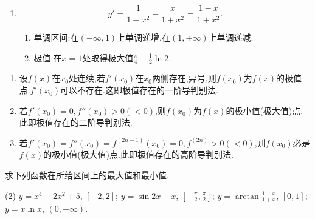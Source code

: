 \begin{solution}
\begin{enumerate}
\begin{enumerate}
              \end{enumerate}
        \item $$y' = \frac{1}{1+x^2} - \frac{x}{1+x^2} = \frac{1 - x}{1 + x^2}.$$
              \begin{enumerate}
                  \item[] 单调区间:在$(-\infty,1)$上单调递增,在$(1,+\infty)$上单调递减.
                  \item[] 极值:在$x = 1$处取得极大值$\frac{\pi}{4} - \frac{1}{2}\ln 2$.
              \end{enumerate}
    \end{enumerate}
\end{solution}

\begin{proposition*}[极值点的判别法] \quad
    \begin{enumerate}
        \item 设$f(x)$在$x_0$处连续,若$f'(x_0)$在$x_0$两侧存在,异号,则$f(x_0)$为$f(x)$的极值点.$f'(x_0)$可以不存在.这即极值存在的一阶导判别法.
        \item 若$f'(x_0) = 0, f''(x_0) > 0(<0)$,则$f(x_0)$为$f(x)$的极小值(极大值)点.此即极值存在的二阶导判别法.
        \item 若$f'(x_0) = f''(x_0) = f^{(2n-1)}(x_0) = 0, f^{(2n)} >0 (<0)$,则$f(x_0)$必是$f(x)$的极小值(极大值)点.此即极值存在的高阶导判别法.
    \end{enumerate}
\end{proposition*}

\begin{exercise}[3.3.22]
    求下列函数在所给区间上的最大值和最小值.
    \begin{tasks}[label=(\arabic*)](2)
        \task $y = x^4 - 2x^2+5$, $[ -2, 2]$;
        \task $y = \sin 2x - x$, $[-\frac{\pi}{2}, \frac{\pi}{2}]$;
        \task $y = \arctan\frac{1-x}{1+x}$, $[0,1]$;
        \task $y = x\ln x$, $(0, +\infty)$.
    \end{tasks}
\end{exercise}

